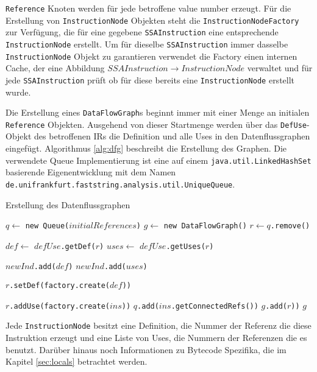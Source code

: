 \texttt{Reference} Knoten werden für jede betroffene value number erzeugt. Für
die Erstellung von \texttt{InstructionNode} Objekten steht die 
\texttt{InstructionNodeFactory} zur Verfügung, die für eine gegebene 
\texttt{SSAInstruction} eine entsprechende \texttt{InstructionNode} erstellt. Um
für dieselbe \texttt{SSAInstruction} immer dasselbe \texttt{InstructionNode} 
Objekt zu garantieren verwendet die Factory einen internen Cache, der eine 
Abbildung $SSAInstruction \rightarrow InstructionNode$ verwaltet und für jede 
\texttt{SSAInstruction} prüft ob für diese bereits eine \texttt{InstructionNode} 
erstellt wurde.

Die Erstellung eines \texttt{DataFlowGraph}s beginnt immer mit einer Menge an 
initialen \texttt{Reference} Objekten. Ausgehend von dieser Startmenge werden über 
das \texttt{DefUse}-Objekt des betroffenen IRs die Definition und alle Uses in den 
Datenflussgraphen eingefügt. Algorithmus \ref{alg:dfg} beschreibt die Erstellung des 
Graphen. Die verwendete Queue Implementierung ist eine auf einem 
\texttt{java.util.LinkedHashSet} basierende Eigenentwicklung mit dem Namen
\texttt{de.unifrankfurt.faststring.analysis.util.UniqueQueue}.

\begin{algorithm}[H]
	\caption{Erstellung des Datenflussgraphen}\label{alg:dfg}
	\begin{algorithmic}[1]
		\STATE $q \gets$ \texttt{new Queue($initialReferences$)}
		\STATE $g \gets$ \texttt{new DataFlowGraph()}
			\STATE $r \gets q$\texttt{.remove()}

				\STATE $def \gets$ \texttt{$defUse$.getDef($r$)}
				\STATE $uses \gets$ \texttt{$defUse$.getUses($r$)}

				\STATE \texttt{$newInd$.add($def$)}
				\STATE \texttt{$newInd$.add($uses$)}

				\STATE \texttt{$r$.setDef(factory.create($def$))}

					\STATE \texttt{$r$.addUse(factory.create($ins$))}
				\ENDFOR
					\STATE \texttt{$q$.add($ins$.getConnectedRefs())}
				\ENDFOR
				\STATE \texttt{$g$.add($r$))}
			\ENDIF
		\ENDWHILE
		\RETURN $g$
	\end{algorithmic}
\end{algorithm}

Jede \texttt{InstructionNode} besitzt eine Definition, die Nummer der Referenz 
die diese Instruktion erzeugt und eine Liste von Uses, die Nummern der Referenzen 
die es benutzt. Darüber hinaus noch Informationen zu Bytecode Spezifika, die 
im Kapitel \ref{sec:locals} betrachtet werden.

